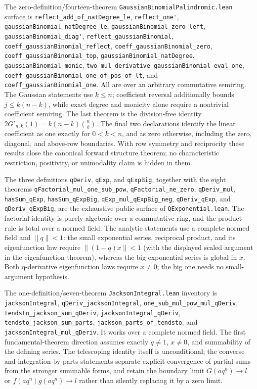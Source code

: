 \documentclass[11pt,oneside]{article}
\theoremstyle{definition}
\theoremstyle{remark}
\begin{document}
The zero-definition/fourteen-theorem
\nolinkurl{GaussianBinomialPalindromic.lean} surface is
\nolinkurl{reflect_add_of_natDegree_le}, \nolinkurl{reflect_one'},
\nolinkurl{gaussianBinomial_natDegree_le},
\nolinkurl{gaussianBinomial_zero_left}, \nolinkurl{gaussianBinomial_diag'},
\nolinkurl{reflect_gaussianBinomial},
\nolinkurl{coeff_gaussianBinomial_reflect},
\nolinkurl{coeff_gaussianBinomial_zero},
\nolinkurl{coeff_gaussianBinomial_top},
\nolinkurl{gaussianBinomial_natDegree}, \nolinkurl{gaussianBinomial_monic},
\nolinkurl{two_mul_derivative_gaussianBinomial_eval_one},
\nolinkurl{coeff_gaussianBinomial_one_of_pos_of_lt}, and
\nolinkurl{coeff_gaussianBinomial_one}.  All are over
an arbitrary commutative semiring.  The Gaussian statements use \(k\le n\);
coefficient reversal additionally bounds \(j\le k(n-k)\), while exact degree
and monicity alone require a nontrivial coefficient semiring.  The last
theorem is the division-free identity
\(2G'_{n,k}(1)=k(n-k)\binom nk\).  The final two declarations identify the
linear coefficient as one exactly for \(0<k<n\), and as zero otherwise,
including the zero, diagonal, and above-row boundaries.  With row symmetry
and reciprocity these results close the canonical forward structure theorem;
no characteristic restriction, positivity, or unimodality claim is hidden in
them.

The three definitions \nolinkurl{qDeriv}, \nolinkurl{qExp}, and
\nolinkurl{qExpBig}, together with the eight theorems
\nolinkurl{qFactorial_mul_one_sub_pow}, \nolinkurl{qFactorial_ne_zero},
\nolinkurl{qDeriv_mul}, \nolinkurl{hasSum_qExp},
\nolinkurl{hasSum_qExpBig}, \nolinkurl{qExp_mul_qExpBig_neg},
\nolinkurl{qDeriv_qExp}, and \nolinkurl{qDeriv_qExpBig}, are the exhaustive
public surface of \nolinkurl{QExponential.lean}.  The factorial identity is
purely algebraic over a commutative ring, and the product rule is total over a
normed field.  The analytic statements use a complete normed field and
\(\lVert q\rVert<1\): the small exponential series, reciprocal product, and
its eigenfunction law require \(\lVert(1-q)x\rVert<1\) (with the displayed
scaled argument in the eigenfunction theorem), whereas the big exponential
series is global in \(x\).  Both q-derivative eigenfunction laws require
\(x\ne0\); the big one needs no small-argument hypothesis.

The one-definition/seven-theorem \nolinkurl{JacksonIntegral.lean} inventory
is \nolinkurl{jacksonIntegral}, \nolinkurl{qDeriv_jacksonIntegral},
\nolinkurl{one_sub_mul_pow_mul_qDeriv},
\nolinkurl{tendsto_jackson_sum_qDeriv},
\nolinkurl{jacksonIntegral_qDeriv},
\nolinkurl{tendsto_jackson_sum_parts},
\nolinkurl{jackson_parts_of_tendsto}, and
\nolinkurl{jacksonIntegral_mul_qDeriv}.  It works over a complete normed
field.  The first fundamental-theorem direction assumes exactly \(q\ne1\),
\(x\ne0\), and summability of the defining series.  The telescoping identity
itself is unconditional; the converse and integration-by-parts statements
separate explicit convergence of partial sums from the stronger summable
forms, and retain the boundary limit \(G(aq^n)\to l\) or
\(f(aq^n)g(aq^n)\to l\) rather than silently replacing it by a zero limit.
\end{document}
